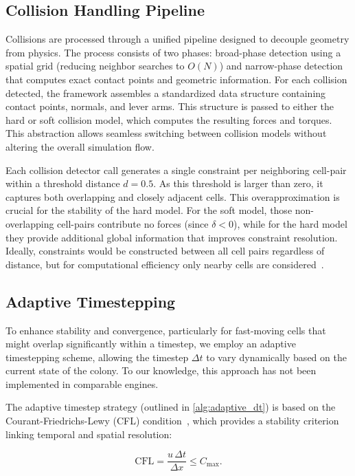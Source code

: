 \documentclass[conference]{IEEEtran}
\begin{document}
\subsection{Collision Handling Pipeline}

Collisions are processed through a unified pipeline designed to decouple geometry from physics. The process consists of two phases: broad-phase detection using a spatial grid (reducing neighbor searches to $O(N)$) and narrow-phase detection that computes exact contact points and geometric information. For each collision detected, the framework assembles a standardized data structure containing contact points, normals, and lever arms. This structure is passed to either the hard or soft collision model, which computes the resulting forces and torques. This abstraction allows seamless switching between collision models without altering the overall simulation flow.

Each collision detector call generates a single constraint per neighboring cell-pair within a threshold distance $d = 0.5$. As this threshold is larger than zero, it captures both overlapping and closely adjacent cells. This overapproximation is crucial for the stability of the hard model. For the soft model, those non-overlapping cell-pairs contribute no forces (since $\delta < 0$), while for the hard model they provide additional global information that improves constraint resolution. Ideally, constraints would be constructed between all cell pairs regardless of distance, but for computational efficiency only nearby cells are considered~\cite{Yan2019, Yan2022,Yan_2020}.

\subsection{Adaptive Timestepping}

To enhance stability and convergence, particularly for fast-moving cells that might overlap significantly within a timestep, we employ an adaptive timestepping scheme, allowing the timestep $\Delta t$ to vary dynamically based on the current state of the colony. To our knowledge, this approach has not been implemented in comparable engines.

The adaptive timestep strategy (outlined in \autoref{alg:adaptive_dt}) is based on the Courant-Friedrichs-Lewy (CFL) condition~\cite{Courant1928}, which provides a stability criterion linking temporal and spatial resolution:

\begin{equation}
    \text{CFL} = \frac{u \, \Delta t}{\Delta x} \leq C_{\text{max}}.
\end{equation}
\end{document}
